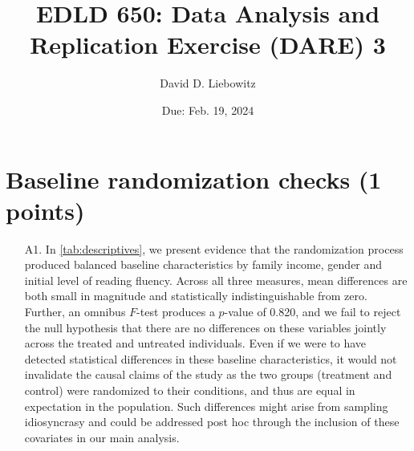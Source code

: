 \documentclass[a4paper, 11pt]{article}
\title{EDLD 650: Data Analysis and Replication Exercise (DARE) 3}
\author{David D. Liebowitz}
\date{Due: Feb. 19, 2024}
\begin{document}
\maketitle



\section{Baseline randomization checks (1 points)}



\begin{enumerate}
	\item[A1.] In \autoref{tab:descriptives}, we present evidence that the randomization process produced balanced baseline characteristics by family income, gender and initial level of reading fluency. Across all three measures, mean differences are both small in magnitude and statistically indistinguishable from zero. Further, an omnibus $F$-test produces a $p$-value of 0.820, and we fail to reject the null hypothesis that there are no differences on these variables jointly across the treated and untreated individuals. Even if we were to have detected statistical differences in these baseline characteristics, it would not invalidate the causal claims of the study as the two groups (treatment and control) were randomized to their conditions, and thus are equal in expectation in the population. Such differences might arise from sampling idiosyncrasy and could be addressed post hoc through the inclusion of these covariates in our main analysis.
\end{enumerate}
\end{document}
